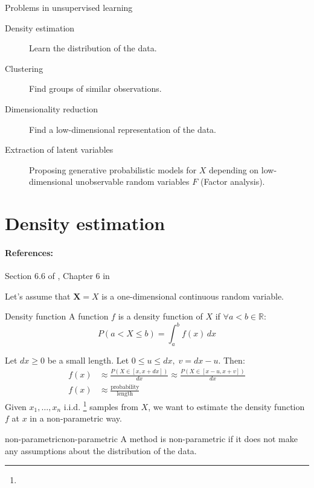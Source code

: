 \begin{example}{Problems in unsupervised learning}{}
	\tcbline
	\begin{description}
		\item[Density estimation] Learn the distribution of the data.
		\item[Clustering] Find groups of similar observations.
		\item[Dimensionality reduction] Find a low-dimensional representation of the data.
		\item[Extraction of latent variables] Proposing generative probabilistic models for $X$
			depending on low-dimensional unobservable random variables $F$ (Factor analysis).
	\end{description}
\end{example}

\pagebreak
\section{Density estimation}

\paragraph{References:} Section 6.6 of \cite{hastie_elements_2009}, Chapter 6 in \cite{wasserman_all_2006}

Let's assume that $\mathbf{X} = X$ is a one-dimensional continuous random variable.

\begin{definition}{Density function}{}
	A function $f$ is a density function of $X$ if $\forall a < b \in \mathds{R}$:
	\begin{equation*}
		P(a < X \leq b) = \int_a^b f(x) \, dx
	\end{equation*}
\end{definition}

Let $dx \geq 0$ be a small length. Let $0 \leq u \leq dx,\; v = dx - u$. Then:
\begin{align*}
	f(x) & \approx \frac{P(X \in [x, x + dx])}{dx} \approx \frac{P(X \in [ x - u, x + v])}{dx} \\
	f(x) & \approx \frac{\text{probability}}{\text{length}}
\end{align*}
Given $x_1, \ldots, x_n$ i.i.d.%
%
\footnote{}
samples from $X$, we want to estimate the density function $f$
at $x$ in a non-parametric way.

\begin{definition}{non-parametric}{non-parametric}
	A method is non-parametric if it does not make any assumptions about the
	distribution of the data.
\end{definition}

